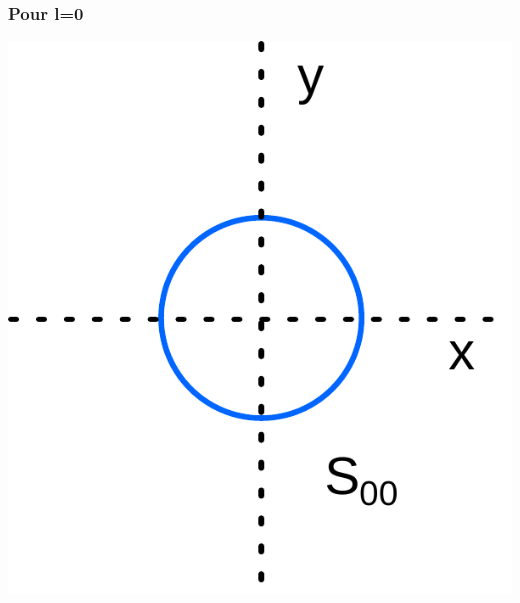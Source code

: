 \documentclass[french]{yLectureNote}
\begin{document}
\subsubsection{Pour l=0}
\includegraphics[scale=0.5]{s00}
\end{document}

